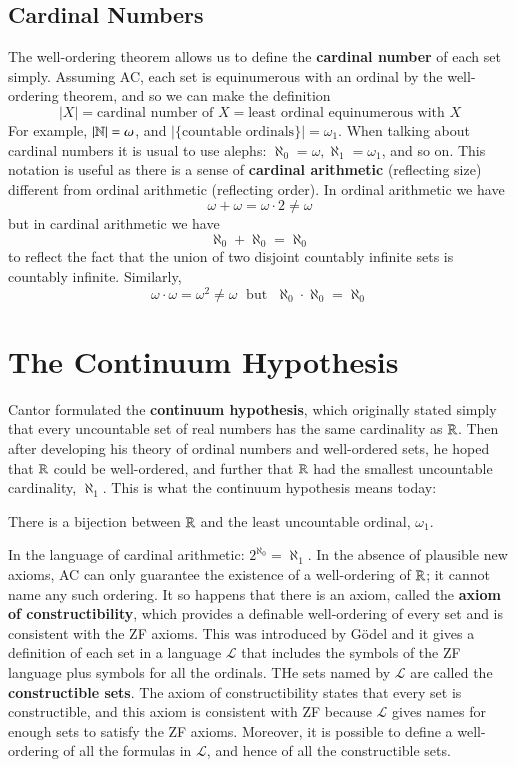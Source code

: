 \documentclass[12pt, a4paper, oneside, openright, titlepage]{book}
\begin{document}
\subsection{Cardinal Numbers}

The well-ordering theorem allows us to define the \textbf{cardinal number} of each set simply. Assuming AC, each set is equinumerous with an ordinal by the well-ordering theorem, and so we can make the definition $$|X| = \text{cardinal number of $X$} = \text{least ordinal equinumerous with $X$}$$
For example, $|\mathbb N| = \omega$, and $|\{\text{countable ordinals}\}| = \omega_1$. When talking about cardinal numbers it is usual to use alephs: $\aleph_0 = \omega,\aleph_1 = \omega_1$, and so on. This notation is useful as there is a sense of \textbf{cardinal arithmetic} (reflecting size) different from ordinal arithmetic (reflecting order). In ordinal arithmetic we have $$\omega+\omega = \omega\cdot 2 \neq \omega$$ but in cardinal arithmetic we have $$\aleph_0+\aleph_0 = \aleph_0$$
to reflect the fact that the union of two disjoint countably infinite sets is countably infinite. Similarly, $$\omega\cdot \omega = \omega^2 \neq \omega\;\text{ but }\;\aleph_0\cdot\aleph_0 = \aleph_0$$



\section{The Continuum Hypothesis}

Cantor formulated the \textbf{continuum hypothesis}, which originally stated simply that every uncountable set of real numbers has the same cardinality as $\mathbb R$. Then after developing his theory of ordinal numbers and well-ordered sets, he hoped that $\mathbb R$ could be well-ordered, and further that $\mathbb R$ had the smallest uncountable cardinality, $\aleph_1$. This is what the continuum hypothesis means today:

\begin{defn}
    There is a bijection between $\mathbb R$ and the least uncountable ordinal, $\omega_1$.
\end{defn}

In the language of cardinal arithmetic: $2^{\aleph_0} = \aleph_1$. In the absence of plausible new axioms, AC can only guarantee the existence of a well-ordering of $\mathbb R$; it cannot name any such ordering. It so happens that there is an axiom, called the \textbf{axiom of constructibility}, which provides a definable well-ordering of every set and is consistent with the ZF axioms. This was introduced by G\"{o}del and it gives a definition of each set in a language $\mathcal{L}$ that includes the symbols of the ZF language plus symbols for all the ordinals. THe sets named by $\mathcal{L}$ are called the \textbf{constructible sets}. The axiom of constructibility states that every set is constructible, and this axiom is consistent with ZF because $\mathcal{L}$ gives names for enough sets to satisfy the ZF axioms. Moreover, it is possible to define a well-ordering of all the formulas in $\mathcal{L}$, and hence of all the constructible sets. 
\end{document}
